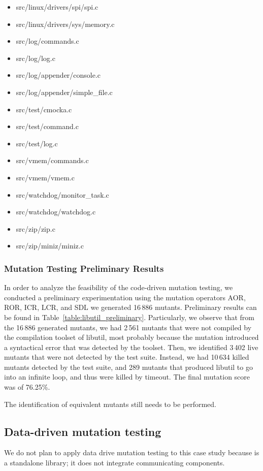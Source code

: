 \begin{itemize}
	\item src/linux/drivers/spi/spi.c
	\item src/linux/drivers/sys/memory.c
	\item src/log/commands.c
	\item src/log/log.c
	\item src/log/appender/console.c
	\item src/log/appender/simple\_file.c
	\item src/test/cmocka.c
	\item src/test/command.c
	\item src/test/log.c
	\item src/vmem/commands.c
	\item src/vmem/vmem.c
	\item src/watchdog/monitor\_task.c
	\item src/watchdog/watchdog.c
	\item src/zip/zip.c
	\item src/zip/miniz/miniz.c
\end{itemize}

\subsubsection{Mutation Testing Preliminary Results}



In order to analyze the feasibility of the code-driven mutation testing, we conducted a preliminary experimentation using the mutation operators AOR, ROR, ICR, LCR, and SDL we generated 16\,886 mutants. Preliminary results can be found in Table~\ref{table:libutil_preliminary}.
Particularly, we observe that from the 16\,886 generated mutants, we had 2\,561 mutants that were not compiled by the compilation toolset of libutil, most probably because the mutation introduced a syntactical error that was detected by the toolset.
Then, we identified 3\,402 live mutants that were not detected by the test suite. Instead, we had 10\,634 killed mutants detected by the test suite, and 289 mutants that produced libutil to go into an infinite loop, and thus were killed by timeout. The final mutation score was of 76.25\%.

The identification of equivalent mutants still needs to be performed.


\subsection{Data-driven mutation testing}

We do not plan to apply data drive mutation testing to this case study because is a standalone library; it does not integrate communicating components.
